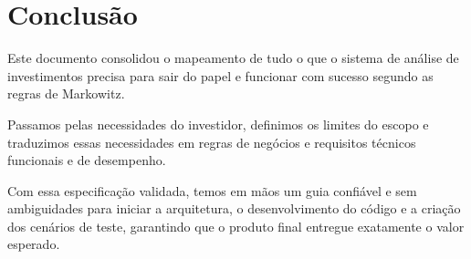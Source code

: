 \section{Conclusão}

Este documento consolidou o mapeamento de tudo o que o sistema de análise de investimentos precisa para sair do papel e funcionar com sucesso segundo as regras de Markowitz. 

Passamos pelas necessidades do investidor, definimos os limites do escopo e traduzimos essas necessidades em regras de negócios e requisitos técnicos funcionais e de desempenho. 

Com essa especificação validada, temos em mãos um guia confiável e sem ambiguidades para iniciar a arquitetura, o desenvolvimento do código e a criação dos cenários de teste, garantindo que o produto final entregue exatamente o valor esperado.

